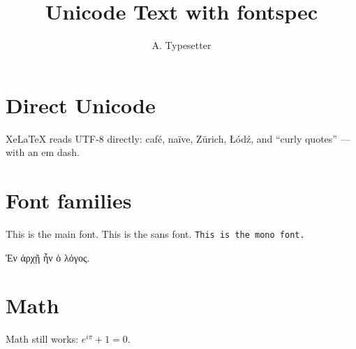 \documentclass{article}
\title{Unicode Text with fontspec}
\author{A. Typesetter}
\begin{document}
\maketitle

\section{Direct Unicode}
XeLaTeX reads UTF-8 directly: café, naïve, Zürich, Łódź, and “curly quotes” — with an em dash.

\section{Font families}
This is the main font. \textsf{This is the sans font.} \texttt{This is the mono font.}

{\greekfont Ἐν ἀρχῇ ἦν ὁ λόγος.}

\section{Math}
Math still works: $e^{i\pi} + 1 = 0$.
\end{document}
